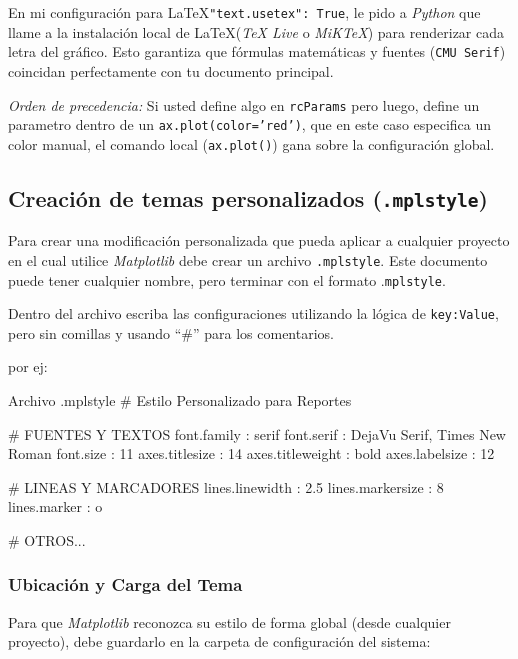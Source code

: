 \begin{nota}
    En mi configuración para \LaTeX  \texttt{"text.usetex": True}, le pido a \textit{Python} que llame a la instalación local de \LaTeX (\textit{TeX Live} o \textit{MiKTeX}) para renderizar cada letra del gráfico. Esto garantiza que fórmulas matemáticas y fuentes (\texttt{CMU Serif}) coincidan perfectamente con tu documento principal.
\end{nota}

\begin{nota}
    \textit{Orden de precedencia:} Si usted define algo en \texttt{rcParams} pero luego, define un parametro dentro de un \texttt{ax.plot(color='red')}, que en este caso especifica un color manual, el comando local (\texttt{ax.plot()}) gana sobre la configuración global.
\end{nota}



\subsection{Creación de temas personalizados (\texttt{.mplstyle})}

Para crear una modificación personalizada que pueda aplicar a cualquier proyecto en el cual utilice \textit{Matplotlib} debe crear un archivo \texttt{.mplstyle}. Este documento puede tener cualquier nombre, pero terminar con el formato .\texttt{mplstyle}.

Dentro del archivo escriba las configuraciones utilizando la lógica de \texttt{key:Value}, pero sin comillas y usando ``\#'' para los comentarios.

por ej:
\begin{pycode}{Archivo .mplstyle}
# Estilo Personalizado para Reportes

# FUENTES Y TEXTOS
font.family : serif
font.serif  : DejaVu Serif, Times New Roman
font.size   : 11
axes.titlesize : 14
axes.titleweight : bold
axes.labelsize : 12

# LINEAS Y MARCADORES
lines.linewidth : 2.5
lines.markersize : 8
lines.marker : o

# OTROS...
\end{pycode}

\subsubsection{Ubicación y Carga del Tema}

Para que \textit{Matplotlib} reconozca su estilo de forma global (desde cualquier proyecto), debe guardarlo en la carpeta de configuración del sistema:

